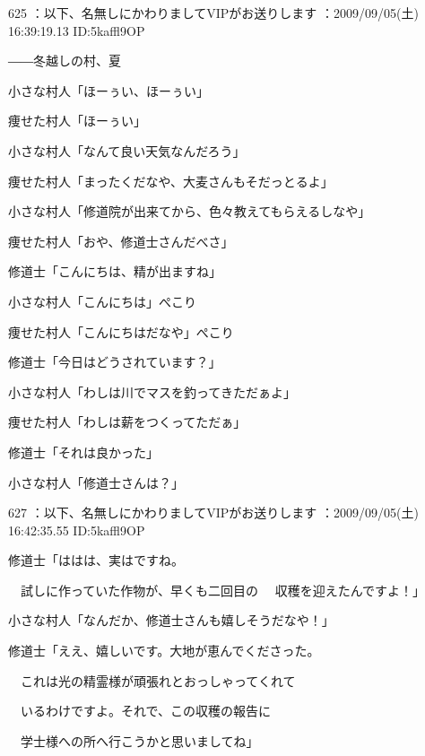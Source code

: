 \documentclass[a4j,twocolumn]{tarticle}
\begin{document}
	
    
    

625 ：以下、名無しにかわりましてVIPがお送りします ：2009/09/05(土) 16:39:19.13 ID:5kaffl9OP 


――冬越しの村、夏 



小さな村人「ほーぅい、ほーぅい」\par{} 
痩せた村人「ほーぅい」 



小さな村人「なんて良い天気なんだろう」\par{} 
痩せた村人「まったくだなや、大麦さんもそだっとるよ」 



小さな村人「修道院が出来てから、色々教えてもらえるしなや」\par{} 
痩せた村人「おや、修道士さんだべさ」 



修道士「こんにちは、精が出ますね」\par{} 
小さな村人「こんにちは」ぺこり\par{} 
痩せた村人「こんにちはだなや」ぺこり 



修道士「今日はどうされています？」\par{} 
小さな村人「わしは川でマスを釣ってきただぁよ」\par{} 
痩せた村人「わしは薪をつくってただぁ」 



修道士「それは良かった」\par{} 
小さな村人「修道士さんは？」 

	
    
    

627 ：以下、名無しにかわりましてVIPがお送りします ：2009/09/05(土) 16:42:35.55 ID:5kaffl9OP 


修道士「ははは、実はですね。\par{} 
　試しに作っていた作物が、早くも二回目の 
　収穫を迎えたんですよ！」 



小さな村人「なんだか、修道士さんも嬉しそうだなや！」 



修道士「ええ、嬉しいです。大地が恵んでくださった。\par{} 
　これは光の精霊様が頑張れとおっしゃってくれて\par{} 
　いるわけですよ。それで、この収穫の報告に\par{} 
　学士様への所へ行こうかと思いましてね」 
\end{document}
